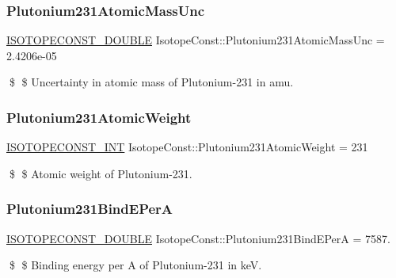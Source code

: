 \subsubsection{\texorpdfstring{Plutonium231\+Atomic\+Mass\+Unc}{Plutonium231AtomicMassUnc}}
{\footnotesize\ttfamily \mbox{\hyperlink{group___isotope_const-_macros_ga8f45a7272ce02c0b4c65c44636ed719a}{I\+S\+O\+T\+O\+P\+E\+C\+O\+N\+S\+T\+\_\+\+D\+O\+U\+B\+LE}} Isotope\+Const\+::\+Plutonium231\+Atomic\+Mass\+Unc = 2.\+4206e-\/05}

\$ \$ Uncertainty in atomic mass of Plutonium-\/231 in amu. \mbox{\label{group___isotope_const-_plutonium-_pu231_ga8d9597ed52a12477fb6ccf5cc1d95857}} 
\subsubsection{\texorpdfstring{Plutonium231\+Atomic\+Weight}{Plutonium231AtomicWeight}}
{\footnotesize\ttfamily \mbox{\hyperlink{group___isotope_const-_macros_ga5f18360b3e99483a35c32d789e62621c}{I\+S\+O\+T\+O\+P\+E\+C\+O\+N\+S\+T\+\_\+\+I\+NT}} Isotope\+Const\+::\+Plutonium231\+Atomic\+Weight = 231}

\$ \$ Atomic weight of Plutonium-\/231. \mbox{\label{group___isotope_const-_plutonium-_pu231_gac8b88f1f58b9df90febfa7d249a047e2}} 
\subsubsection{\texorpdfstring{Plutonium231\+Bind\+E\+PerA}{Plutonium231BindEPerA}}
{\footnotesize\ttfamily \mbox{\hyperlink{group___isotope_const-_macros_ga8f45a7272ce02c0b4c65c44636ed719a}{I\+S\+O\+T\+O\+P\+E\+C\+O\+N\+S\+T\+\_\+\+D\+O\+U\+B\+LE}} Isotope\+Const\+::\+Plutonium231\+Bind\+E\+PerA = 7587.}

\$ \$ Binding energy per A of Plutonium-\/231 in keV. \mbox{\label{group___isotope_const-_plutonium-_pu231_gafc99c7e7d8462c49b9c491c7b9b49bbb}} 
